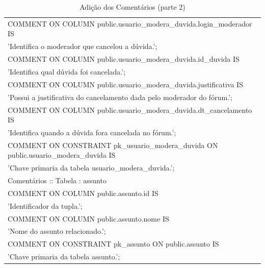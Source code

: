 \documentclass[graduacao,brazil]{ThesisPUC}
\begin{document}
\begin{table}[H]
{\begin{tabular}{|l|}
    COMMENT ON COLUMN public.usuario\_modera\_duvida.login\_moderador IS \\'Identifica o moderador que cancelou a dúvida.'; \\COMMENT ON COLUMN public.usuario\_modera\_duvida.id\_duvida IS \\'Identifica qual dúvida foi cancelada.'; \\COMMENT ON COLUMN public.usuario\_modera\_duvida.justificativa IS \\'Possui a justificativa do cancelamento dada pelo moderador do fórum.'; \\COMMENT ON COLUMN public.usuario\_modera\_duvida.dt\_cancelamento IS \\'Identifica quando a dúvida fora cancelada no fórum.'; \\COMMENT ON CONSTRAINT pk\_usuario\_modera\_duvida ON public.usuario\_modera\_duvida IS \\'Chave primaria da tabela usuario\_modera\_duvida.'; \\ \hline
    Comentários :: Tabela : assunto                                                                                                                                                                                                                                                                                                                                                                                                                                                                                                                                                                                                       \\ \hline
    COMMENT ON COLUMN public.assunto.id IS \\'Identificador da tupla.'; \\COMMENT ON COLUMN public.assunto.nome IS \\'Nome do assunto relacionado.'; \\COMMENT ON CONSTRAINT pk\_assunto ON public.assunto IS \\'Chave primaria da tabela assunto.';                                                                                                                                                                                                                                                                                                                                                                                      \\ \hline
    \end{tabular}
    }
    \caption {Adi\c{c}\~{a}o dos Coment\'{a}rios (parte 2)}
\end{table}
\end{document}
